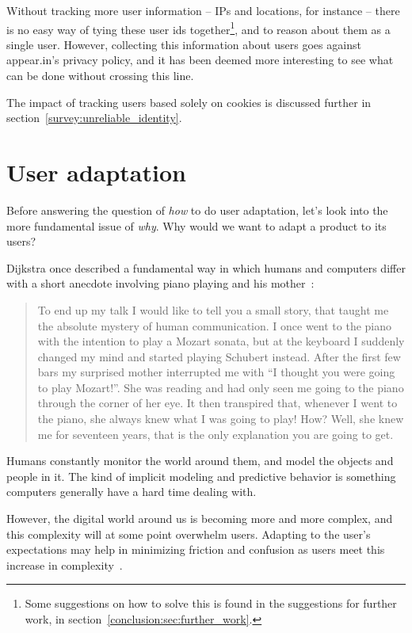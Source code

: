 Without tracking more user information -- IPs and locations, for instance -- there is no easy way of tying these user ids together\footnote{Some suggestions on how to solve this is found in the suggestions for further work, in section~\ref{conclusion:sec:further_work}.}, and to reason about them as a single user. However, collecting this information about users goes against appear.in's privacy policy, and it has been deemed more interesting to see what can be done without crossing this line.

The impact of tracking users based solely on cookies is discussed further in section~\ref{survey:unreliable_identity}.

\section{User adaptation}
\label{intro:sec:adaptation}

Before answering the question of \emph{how} to do user adaptation, let's look into the more fundamental issue of \emph{why}. Why would we want to adapt a product to its users?

Dijkstra once described a fundamental way in which humans and computers differ with a short anecdote involving piano playing and his mother~\cite{Dijkstra1982}:

\begin{quote}
    To end up my talk I would like to tell you a small story, that taught me the absolute mystery of human communication. I once went to the piano with the intention to play a Mozart sonata, but at the keyboard I suddenly changed my mind and started playing Schubert instead. After the first few bars my surprised mother interrupted me with ``I thought you were going to play Mozart!''. She was reading and had only seen me going to the piano through the corner of her eye. It then transpired that, whenever I went to the piano, she always knew what I was going to play! How? Well, she knew me for seventeen years, that is the only explanation you are going to get.
\end{quote}

Humans constantly monitor the world around them, and model the objects and people in it. The kind of implicit modeling and predictive behavior is something computers generally have a hard time dealing with.

However, the digital world around us is becoming more and more complex, and this complexity will at some point overwhelm users. Adapting to the user's expectations may help in minimizing friction and confusion as users meet this increase in complexity~\cite{Vrieze}.

